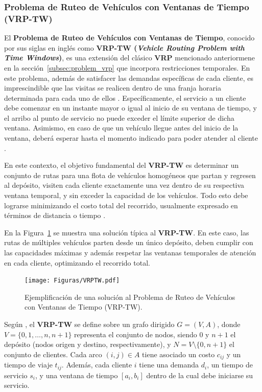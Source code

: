 \documentclass[12pt,titlepage,twoside,openright]{book}
\begin{document}
\subsubsection{Problema de Ruteo de Vehículos con Ventanas de Tiempo (VRP-TW)}
\label{subsec:problem_vrptw}

El \textbf{Problema de Ruteo de Vehículos con Ventanas de Tiempo}, conocido por sus siglas en inglés como \textbf{VRP-TW (\textit{Vehicle Routing Problem with Time Windows})}, es una extensión del clásico \textbf{VRP} mencionado anteriormene en la sección~\ref{subsec:problem_vrp} que incorpora restricciones temporales. En este problema, además de satisfacer las demandas específicas de cada cliente, es imprescindible que las visitas se realicen dentro de una franja horaria determinada para cada uno de ellos \citep{toth2014}. Específicamente, el servicio a un cliente debe comenzar en un instante mayor o igual al inicio de su ventana de tiempo, y el arribo al punto de servicio no puede exceder el límite superior de dicha ventana. Asimismo, en caso de que un vehículo llegue antes del inicio de la ventana, deberá esperar hasta el momento indicado para poder atender al cliente \citep{montes2017}.

En este contexto, el objetivo fundamental del \textbf{VRP-TW} es determinar un conjunto de rutas para una flota de vehículos homogéneos que partan y regresen al depósito, visiten cada cliente exactamente una vez dentro de su respectiva ventana temporal, y sin exceder la capacidad de los vehículos. Todo esto debe lograrse minimizando el costo total del recorrido, usualmente expresado en términos de distancia o tiempo \cite{solomon1987algorithms}.

En la Figura~\ref{fig:vrptw} se muestra una solución típica al \textbf{VRP-TW}. En este caso, las rutas de múltiples vehículos parten desde un único depósito, deben cumplir con las capacidades máximas y además respetar las ventanas temporales de atención en cada cliente, optimizando el recorrido total.

\begin{figure}[H]
	\centering
	\texttt{[image: Figuras/VRPTW.pdf]}
	\caption{Ejemplificación de una solución al Problema de Ruteo de Vehículos con Ventanas de Tiempo (VRP-TW).}
	\label{fig:vrptw}
\end{figure}

Según \citep{toth2014}, el \textbf{VRP-TW} se define sobre un grafo dirigido \(G = (V, A)\), donde \(V = \{0, 1, \dots, n, n+1\}\) representa el conjunto de nodos, siendo \(0\) y \(n+1\) el depósito (nodos origen y destino, respectivamente), y \(N = V \setminus \{0, n+1\}\) el conjunto de clientes. Cada arco \((i, j) \in A\) tiene asociado un costo \(c_{ij}\) y un tiempo de viaje \(t_{ij}\). Además, cada cliente \(i\) tiene una demanda \(d_i\), un tiempo de servicio \(s_i\), y una ventana de tiempo \([a_i, b_i]\) dentro de la cual debe iniciarse su servicio.
\end{document}

